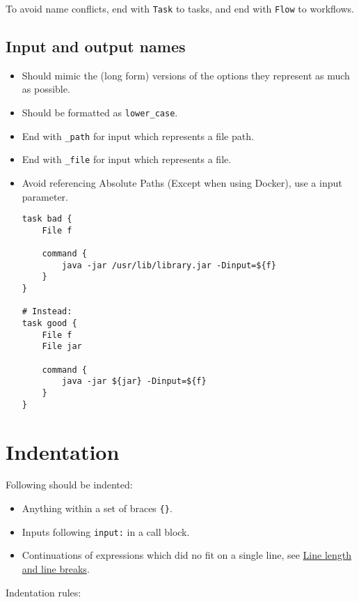 \documentclass[
]{book}
\providecommand{\tightlist}{%
  \setlength{\itemsep}{0pt}\setlength{\parskip}{0pt}}
\begin{document}
To avoid name conflicts, end with \texttt{Task} to tasks, and end with \texttt{Flow} to
workflows.

\hypertarget{input-and-output-names}{%
\subsection{Input and output names}\label{input-and-output-names}}

\begin{itemize}
\item
  Should mimic the (long form) versions of the options they
  represent as much as possible.
\item
  Should be formatted as \texttt{lower\_case}.
\item
  End with \texttt{\_path} for input which represents a file path.
\item
  End with \texttt{\_file} for input which represents a file.
\item
  Avoid referencing Absolute Paths (Except when using Docker), use a input
  parameter.

\begin{verbatim}
task bad {
    File f

    command {
        java -jar /usr/lib/library.jar -Dinput=${f}
    }
}

# Instead:
task good {
    File f
    File jar

    command {
        java -jar ${jar} -Dinput=${f}
    }
}
\end{verbatim}
\end{itemize}

\hypertarget{indentation-2}{%
\section{Indentation}\label{indentation-2}}

Following should be indented:

\begin{itemize}
\tightlist
\item
  Anything within a set of braces \texttt{\{\}}.
\item
  Inputs following \texttt{input:} in a call block.
\item
  Continuations of expressions which did no fit on a single line,
  see \protect\hyperlink{line-length-and-line-breaks}{Line length and line breaks}.
\end{itemize}

Indentation rules:
\end{document}
